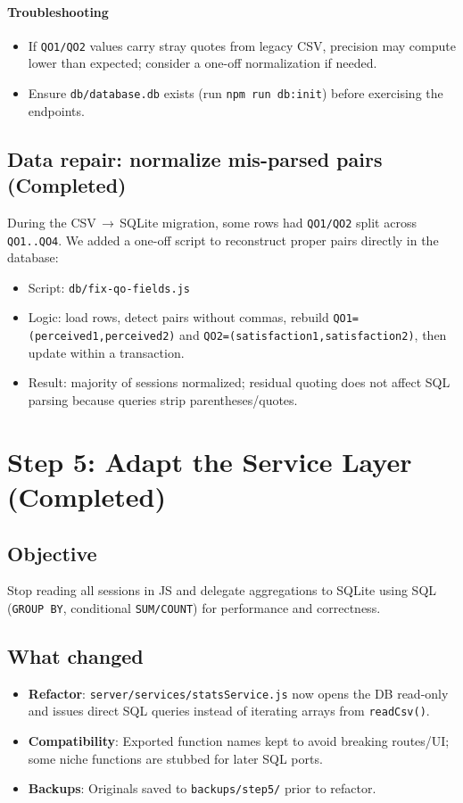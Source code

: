 \documentclass[11pt,a4paper]{article}
\begin{document}
\paragraph{Troubleshooting}
\begin{itemize}[noitemsep]
  \item If \texttt{QO1/QO2} values carry stray quotes from legacy CSV, precision may compute lower than expected; consider a one-off normalization if needed.
  \item Ensure \texttt{db/database.db} exists (run \texttt{npm run db:init}) before exercising the endpoints.
\end{itemize}
\subsection{Data repair: normalize mis-parsed pairs (Completed)}
During the CSV\,$\to$\,SQLite migration, some rows had \texttt{QO1/QO2} split across \texttt{QO1..QO4}. We added a one-off script to reconstruct proper pairs directly in the database:
\begin{itemize}[noitemsep]
  \item Script: \texttt{db/fix-qo-fields.js}
  \item Logic: load rows, detect pairs without commas, rebuild \texttt{QO1=(perceived1,perceived2)} and \texttt{QO2=(satisfaction1,satisfaction2)}, then update within a transaction.
  \item Result: majority of sessions normalized; residual quoting does not affect SQL parsing because queries strip parentheses/quotes.
\end{itemize}

\section{Step 5: Adapt the Service Layer (Completed)}
\subsection{Objective}
Stop reading all sessions in JS and delegate aggregations to SQLite using SQL (\texttt{GROUP BY}, conditional \texttt{SUM/COUNT}) for performance and correctness.

\subsection{What changed}
\begin{itemize}[noitemsep]
  \item \textbf{Refactor}: \texttt{server/services/statsService.js} now opens the DB read-only and issues direct SQL queries instead of iterating arrays from \texttt{readCsv()}.
  \item \textbf{Compatibility}: Exported function names kept to avoid breaking routes/UI; some niche functions are stubbed for later SQL ports.
  \item \textbf{Backups}: Originals saved to \texttt{backups/step5/} prior to refactor.
\end{itemize}
\end{document}
